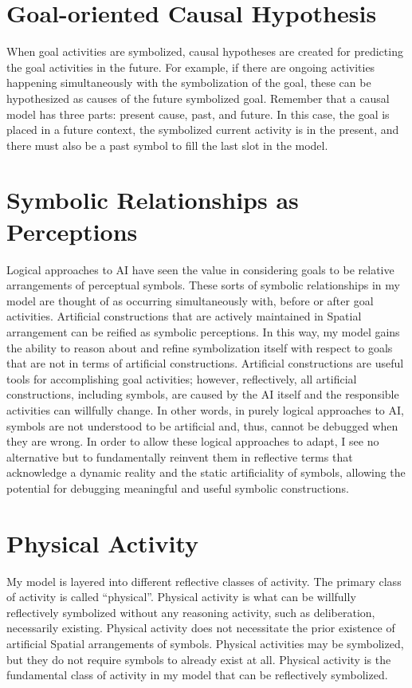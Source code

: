 \section{Goal-oriented Causal Hypothesis}

When goal activities are symbolized, causal hypotheses are created for
predicting the goal activities in the future.  For example, if there
are ongoing activities happening simultaneously with the symbolization
of the goal, these can be hypothesized as causes of the future
symbolized goal.  Remember that a causal model has three parts:
present cause, past, and future.  In this case, the goal is placed in
a future context, the symbolized current activity is in the present,
and there must also be a past symbol to fill the last slot in the
model.

\section{Symbolic Relationships as Perceptions}

Logical approaches to AI have seen the value in considering goals to
be relative arrangements of perceptual symbols.  These sorts of
symbolic relationships in my model are thought of as occurring
simultaneously with, before or after goal activities.  Artificial
constructions that are actively maintained in Spatial arrangement can
be reified as symbolic perceptions.  In this way, my model gains the
ability to reason about and refine symbolization itself with respect
to goals that are not in terms of artificial constructions.
Artificial constructions are useful tools for accomplishing goal
activities; however, reflectively, all artificial constructions,
including symbols, are caused by the AI itself and the responsible
activities can willfully change.  In other words, in purely logical
approaches to AI, symbols are not understood to be artificial and,
thus, cannot be debugged when they are wrong.  In order to allow these
logical approaches to adapt, I see no alternative but to fundamentally
reinvent them in reflective terms that acknowledge a dynamic reality
and the static artificiality of symbols, allowing the potential for
debugging meaningful and useful symbolic constructions.

\section{Physical Activity}

My model is layered into different reflective classes of activity.
The primary class of activity is called ``physical''.  Physical
activity is what can be willfully reflectively symbolized without any
reasoning activity, such as deliberation, necessarily existing.
Physical activity does not necessitate the prior existence of
artificial Spatial arrangements of symbols.  Physical activities may
be symbolized, but they do not require symbols to already exist at
all.  Physical activity is the fundamental class of activity in my
model that can be reflectively symbolized.

